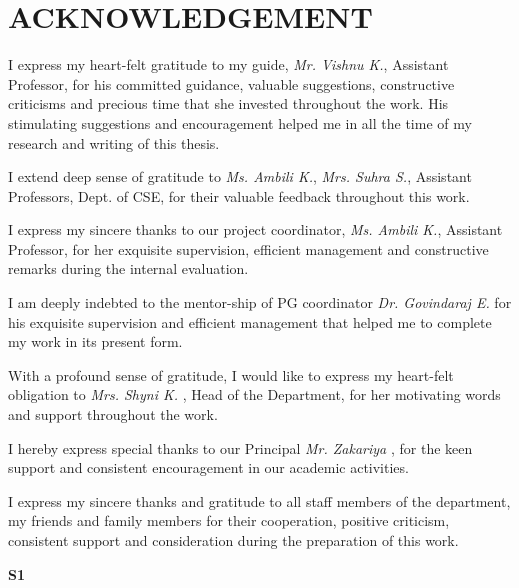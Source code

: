 \chapter*{ACKNOWLEDGEMENT}

\begin{acknowledgement}
\newcommand{\tab}{\hspace*{2em}}

\hspace{0.75cm} I express my heart-felt gratitude to  my guide, \emph{Mr. Vishnu K.}, Assistant Professor, for his committed guidance, valuable suggestions, constructive criticisms and precious time that she invested throughout the work. His stimulating suggestions and encouragement helped me in all the time of my research and writing of this thesis.

I extend deep sense of gratitude to  \emph{Ms. Ambili K.}, \emph{Mrs. Suhra S.}, Assistant Professors, Dept. of CSE, for their valuable feedback  throughout this work.

I express my sincere thanks to our project coordinator, \emph{Ms. Ambili K.}, Assistant Professor, for her exquisite supervision, efficient management and constructive remarks during the internal evaluation.

I am deeply indebted to the mentor-ship of PG coordinator \emph{Dr. Govindaraj E.} for his exquisite  supervision and efficient management that helped me to complete my work in its present form.

With a profound sense of gratitude, I would like to express my heart-felt obligation to \emph{Mrs. Shyni K. }, Head of the Department, for her motivating words and support throughout the work.

I hereby express special thanks to our Principal \emph{Mr. Zakariya }, for the keen support and consistent encouragement in our academic activities. 

I express my sincere thanks and gratitude to all staff members of the department, my friends and family members for their cooperation, positive criticism, consistent support and consideration during the preparation of this work.

\vspace *{1 cm}
\begin{raggedright}
\vspace*{5mm}
\hspace*{112mm}
\textbf{S1}
\end{raggedright}

\end{acknowledgement}